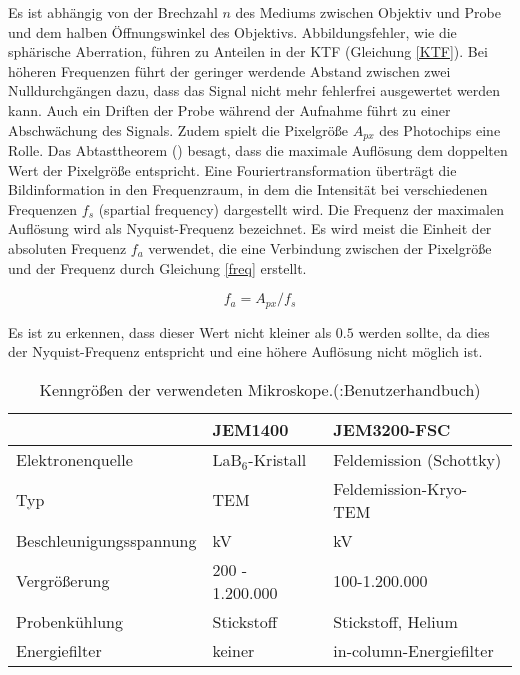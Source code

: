 Es ist abhängig von der Brechzahl $n$ des Mediums zwischen Objektiv und Probe und dem halben Öffnungswinkel des Objektivs.
Abbildungsfehler, wie die sphärische Aberration, führen zu Anteilen in der KTF (Gleichung \eqref{KTF}).
Bei höheren Frequenzen führt der geringer werdende Abstand zwischen zwei Nulldurchgängen dazu, dass das Signal nicht mehr fehlerfrei ausgewertet werden kann.
Auch ein Driften der Probe während der Aufnahme führt zu einer Abschwächung des Signals.
Zudem spielt die Pixelgröße $A_{px}$ des Photochips eine Rolle.
Das Abtasttheorem (\cite{numerical_recipes}) besagt, dass die maximale Auflösung dem doppelten Wert der Pixelgröße entspricht.
Eine Fouriertransformation überträgt die Bildinformation in den Frequenzraum, in dem die Intensität bei verschiedenen Frequenzen $f_s$ (spartial frequency) dargestellt wird.
Die Frequenz der maximalen Auflösung wird als Nyquist-Frequenz bezeichnet.
Es wird meist die Einheit der absoluten Frequenz $f_a$ verwendet, die eine Verbindung zwischen der Pixelgröße und der Frequenz durch Gleichung \eqref{freq} erstellt.

\begin{equation}
	f_a = A_{px} / f_s \label{freq}
\end{equation}

Es ist zu erkennen, dass dieser Wert nicht kleiner als $0.5$ werden sollte, da dies der Nyquist-Frequenz entspricht und eine höhere Auflösung nicht möglich ist.

\begin{table}

	\begin{tabular}[h!]{l l l}
			&	JEM1400	&	JEM3200-FSC\\
		\hline
		Elektronenquelle & LaB$_6$-Kristall & Feldemission (Schottky)\\
		Typ	&	TEM	&	Feldemission-Kryo-TEM\\
		Beschleunigungsspannung & \unit[40-120]{kV} & \unit[100-300]{kV}\\
		Vergrößerung & 200 - 1.200.000 & 100-1.200.000\\
		Probenkühlung & Stickstoff & Stickstoff, Helium\\
		Energiefilter & keiner & in-column-Energiefilter\\
		\hline
		\hline


	\end{tabular}
	\caption[Mikroskopdaten]{Kenngrößen der verwendeten Mikroskope.(\cite{jeol}:Benutzerhandbuch)}
	\label{TEM_tab}
\end{table}

\FloatBarrier